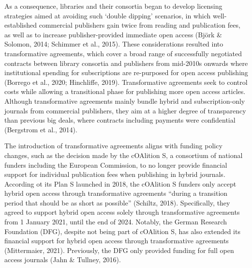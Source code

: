 \documentclass[a4paper,man,floatsintext,longtable,noextraspace,12pt]{apa6}
\begin{document}
As a consequence, libraries and their consortia began to develop
licensing strategies aimed at avoiding such `double dipping' scenarios,
in which well-established commercial publishers gain twice from reading
and publication fees, as well as to increase publisher-provided
immediate open access (Björk \& Solomon, 2014; Schimmer et al., 2015).
These considerations resulted into transformative agreements, which
cover a broad range of successfully negotiated contracts between library
consortia and publishers from mid-2010s onwards where institutional
spending for subscriptions are re-purposed for open access publishing
(Borrego et al., 2020; Hinchliffe, 2019). Transformative agreements seek
to control costs while allowing a transitional phase for publishing more
open access articles. Although transformative agreements mainly bundle
hybrid and subscription-only journals from commercial publishers, they
aim at a higher degree of transparency than previous big deals, where
contracts including payments were confidential (Bergstrom et al., 2014).

The introduction of transformative agreements aligns with funding policy
changes, such as the decision made by the cOAlition S, a consortium of
national funders including the European Commission, to no longer provide
financial support for individual publication fees when publishing in
hybrid journals. According ot its Plan S launched in 2018, the cOAlition
S funders only accept hybrid open access through transformative
agreements ``during a transition period that should be as short as
possible'' (Schiltz, 2018). Specifically, they agreed to support hybrid
open access solely through transformative agreements from 1 January
2021, until the end of 2024. Notably, the German Research Foundation
(DFG), despite not being part of cOAlition S, has also extended its
financial support for hybrid open access through transformative
agreements (Mittermaier, 2021). Previously, the DFG only provided
funding for full open access journals (Jahn \& Tullney, 2016).
\end{document}
